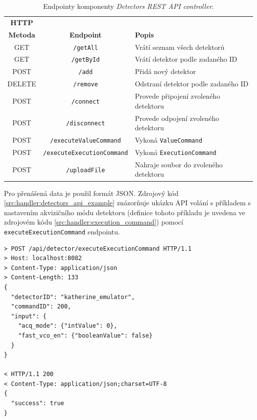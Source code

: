 \begin{table}[h]
	\begin{center}
		\begin{tabular}{|c|c|l|}
			\hline
      \textbf{HTTP} & & \\
      \textbf{Metoda} & \textbf{Endpoint} & \textbf{Popis} \\
			\hline
      GET & \texttt{/getAll} & Vrátí seznam všech detektorů \\
      GET & \texttt{/getById} & Vrátí detektor podle zadaného ID \\
      POST & \texttt{/add} & Přidá nový detektor \\
      DELETE & \texttt{/remove} & Odstraní detektor podle zadaného ID \\
      POST & \texttt{/connect} & Provede připojení zvoleného detektoru \\
      POST & \texttt{/disconnect} & Provede odpojení zvoleného detektoru \\
      POST & \texttt{/executeValueCommand} & Vykoná \texttt{ValueCommand} \\
      POST & \texttt{/executeExecutionCommand} & Vykoná \texttt{ExecutionCommand} \\
      POST & \texttt{/uploadFile} & Nahraje soubor do zvoleného detektoru \\
			\hline
		\end{tabular}
	\end{center}
	\caption{Endpointy komponenty \textit{Detectors REST API controller}.}
	\label{tab:handler:api_detectors}
\end{table}

Pro přenášená data je použil formát JSON. Zdrojový kód \ref{src:handler:detectors_api_example} znázorňuje ukázku API volání s příkladem s nastavením akvizičního módu detektoru (definice tohoto příkladu je uvedena ve zdrojovém kódu \ref{src:handler:execution_command}) pomocí \texttt{executeExecutionCommand} endpointu.

\begin{code}[h!]
\begin{verbatim}
> POST /api/detector/executeExecutionCommand HTTP/1.1
> Host: localhost:8082
> Content-Type: application/json
> Content-Length: 133
{
  "detectorID": "katherine_emulator",
  "commandID": 200,
  "input": {
    "acq_mode": {"intValue": 0},
    "fast_vco_en": {"booleanValue": false}
  }
}

< HTTP/1.1 200 
< Content-Type: application/json;charset=UTF-8
{
  "success": true
}
\end{verbatim}
\caption{Příklad volání API komponenty pro správu detektorů. V příkladu na řádcích 1 až 12 je \textit{request} pro vykonání \texttt{ExecutionCommand} pro nastavení akvizičního módu detektoru a na řádcích 14 až 18 je \textit{response} serveru.}
\label{src:handler:detectors_api_example}
\end{code}

